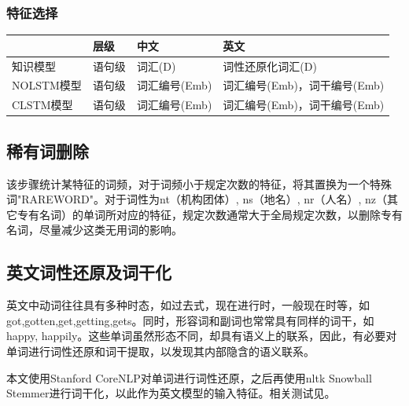 \subsubsection{特征选择}
\begin{center}
\begin{tabu}to \textwidth{X|X|X[3]|X[3]} 
\hline
& 层级 & 中文 & 英文\\
\hline
知识模型 & 语句级 & 词汇(D) & 词性还原化词汇(D)\\
\hline
NOLSTM模型 & 语句级 & 词汇编号(Emb) & 词汇编号(Emb)，词干编号(Emb)\\
\hline
CLSTM模型 & 语句级 & 词汇编号(Emb) & 词汇编号(Emb)，词干编号(Emb)\\
\hline
\end{tabu}
\end{center}

\subsection{稀有词删除}
该步骤统计某特征的词频，对于词频小于规定次数的特征，将其置换为一个特殊词"RAREWORD"。对于词性为nt（机构团体）, ns（地名）, nr（人名）, nz（其它专有名词）的单词所对应的特征，规定次数通常大于全局规定次数，以删除专有名词，尽量减少这类无用词的影响。

\subsection{英文词性还原及词干化}
英文中动词往往具有多种时态，如过去式，现在进行时，一般现在时等，如got,gotten,get,getting,gets。同时，形容词和副词也常常具有同样的词干，如happy, happily。这些单词虽然形态不同，却具有语义上的联系，因此，有必要对单词进行词性还原和词干提取，以发现其内部隐含的语义联系。\par
本文使用Stanford CoreNLP对单词进行词性还原，之后再使用nltk Snowball Stemmer进行词干化，以此作为英文模型的输入特征。相关测试见。